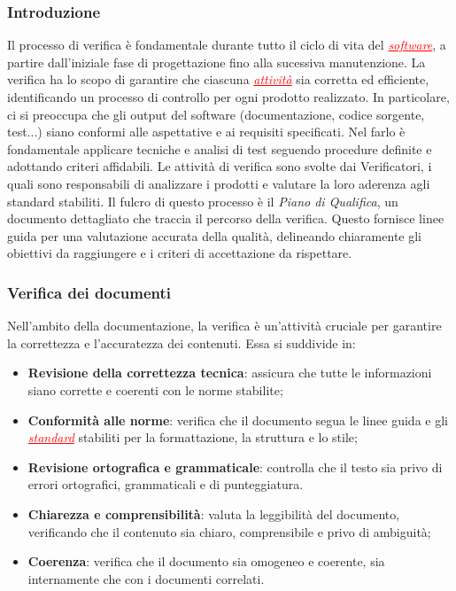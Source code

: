 \subsubsection{Introduzione}
Il processo di verifica è fondamentale durante tutto il ciclo di vita del \textcolor{red}{\uline{\textit{software}}}, a partire dall'iniziale fase
di progettazione fino alla sucessiva manutenzione. La verifica ha lo scopo di garantire che ciascuna \textcolor{red}{\uline{\textit{attività}}}
sia corretta ed efficiente, identificando un processo di controllo per ogni prodotto realizzato. In particolare, ci si preoccupa che gli output
del software (documentazione, codice sorgente, test...) siano conformi alle aspettative e ai requisiti specificati. Nel farlo è fondamentale
applicare tecniche e analisi di test seguendo procedure definite e adottando criteri affidabili.
Le attività di verifica sono svolte dai Verificatori, i quali sono responsabili di analizzare i prodotti e valutare la loro aderenza agli standard
stabiliti. Il fulcro di questo processo è il \textit{Piano di Qualifica}, un documento dettagliato che traccia il percorso della verifica.
Questo fornisce linee guida per una valutazione accurata della qualità, delineando chiaramente gli obiettivi da raggiungere e i criteri di
accettazione da rispettare.

\subsubsection{Verifica dei documenti} \label{verifica_dei_documenti}
Nell'ambito della documentazione, la verifica è un'attività cruciale per garantire la correttezza e l'accuratezza dei contenuti. Essa si suddivide in:
\begin{itemize}
    \item \textbf{Revisione della correttezza tecnica}: assicura che tutte le informazioni siano corrette e coerenti con le norme stabilite;
    \item \textbf{Conformità alle norme}: verifica che il documento segua le linee guida e gli \textcolor{red}{\uline{\textit{standard}}}
        stabiliti per la formattazione, la struttura e lo stile;
    \item \textbf{Revisione ortografica e grammaticale}: controlla che il testo sia privo di errori ortografici, grammaticali e di punteggiatura.
    \item \textbf{Chiarezza e comprensibilità}: valuta la leggibilità del documento, verificando che il contenuto sia chiaro, comprensibile e privo di ambiguità;
    \item \textbf{Coerenza}: verifica che il documento sia omogeneo e coerente, sia internamente che con i documenti correlati.
\end{itemize}

